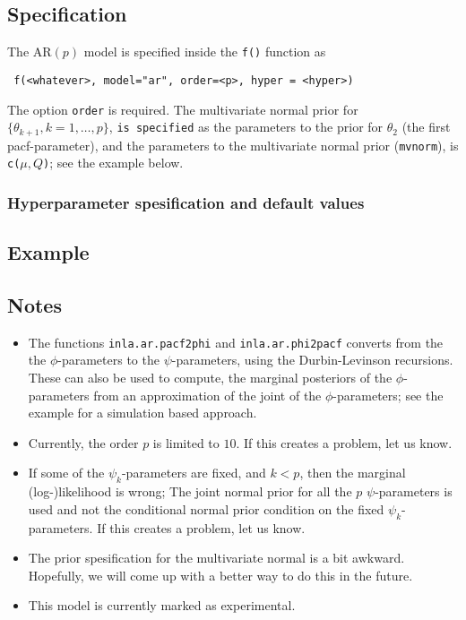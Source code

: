 \documentclass[a4paper,11pt]{article}
\begin{document}
\subsection*{Specification}

The AR$(p)$ model is specified inside the {\tt f()} function as
\begin{verbatim}
 f(<whatever>, model="ar", order=<p>, hyper = <hyper>)
\end{verbatim}
The option \texttt{order} is required. The multivariate normal prior
for $\{\theta_{k+1}, k=1, \ldots, p\}$, \texttt{is specified} as the
parameters to the prior for $\theta_{2}$ (the first pacf-parameter),
and the parameters to the multivariate normal prior (\texttt{mvnorm}),
is \texttt{c($\mu, Q$)}; see the example below.

\subsubsection*{Hyperparameter spesification and default values}


\subsection*{Example}



\subsection*{Notes}

\begin{itemize}
\item The functions \texttt{inla.ar.pacf2phi} and
    \texttt{inla.ar.phi2pacf} converts from the the $\phi$-parameters
    to the $\psi$-parameters, using the Durbin-Levinson
    recursions. These can also be used to compute, the marginal
    posteriors of the $\phi$-parameters from an approximation of the
    joint of the $\phi$-parameters; see the example for a simulation
    based approach.
\item Currently, the order $p$ is limited to $10$. If this creates a
    problem, let us know.
\item If some of the $\psi_{k}$-parameters are fixed, and $k < p$,
    then the marginal (log-)likelihood is wrong; The joint normal
    prior for all the $p$ $\psi$-parameters is used and not the
    conditional normal prior condition on the fixed
    $\psi_{k}$-parameters. If this creates a problem, let us know.
\item The prior spesification for the multivariate normal is a bit
    awkward. Hopefully, we will come up with a better way to do this
    in the future.
\item This model is currently marked as experimental.
\end{itemize}
\end{document}

